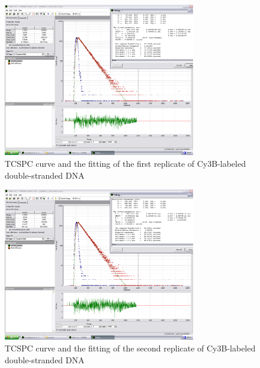 \documentclass[a4paper,english,12pt,bibliography=totoc]{scrreprt}
\begin{document}
\begin{figure}
    \centering
    \includegraphics[width=0.75\textwidth]{images/dsDNA/dsDNA_Cy3B_data1_fit1.png}
    \caption{TCSPC curve and the fitting of the first replicate of Cy3B-labeled double-stranded DNA}
    \label{dsDNA_Cy3B_data1_fit1}
\end{figure}

\begin{figure}
    \centering
    \includegraphics[width=0.75\textwidth]{images/dsDNA/dsDNA_Cy3B_data2_fit1.png}
    \caption{TCSPC curve and the fitting of the second replicate of Cy3B-labeled double-stranded DNA}
    \label{dsDNA_Cy3B_data2_fit1}
\end{figure}
\end{document}
